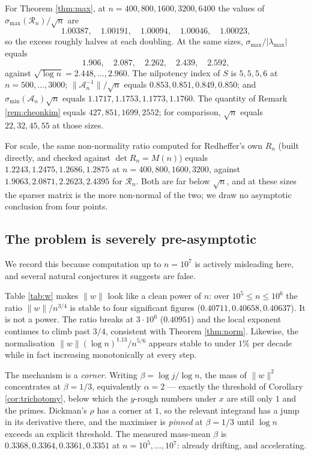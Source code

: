 \documentclass[11pt]{article}
\theoremstyle{definition}
\theoremstyle{remark}
\newcommand{\Rc}{\mathcal{R}}
\newcommand{\Ac}{\mathcal{A}}
\begin{document}
For Theorem \ref{thm:max}, at $n=400,800,1600,3200,6400$ the values of
$\sigma_{\max}(\Rc_n)/\sqrt n$ are
\[
 1.00387,\quad 1.00191,\quad 1.00094,\quad 1.00046,\quad 1.00023,
\]
so the excess roughly halves at each doubling. At the same sizes,
$\sigma_{\max}/|\lambda_{\max}|$ equals
\[
 1.906,\quad 2.087,\quad 2.262,\quad 2.439,\quad 2.592,
\]
against $\sqrt{\log n}=2.448,\dots,2.960$. The nilpotency index of $S$ is
$5,5,5,6$ at $n=500,\dots,3000$; $\|\Ac_n^{-1}\|/\sqrt n$ equals
$0.853,0.851,0.849,0.850$; and $\sigma_{\min}(\Ac_n)\sqrt n$ equals
$1.1717,1.1753,1.1773,1.1760$. The quantity of Remark \ref{rem:cheonkim} equals
$427,851,1699,2552$; for comparison, $\sqrt n$ equals $22,32,45,55$ at those
sizes.

For scale, the same non-normality ratio computed for Redheffer's own $R_n$ (built
directly, and checked against $\det R_n=M(n)$) equals
$1.2243,1.2475,1.2686,1.2875$ at $n=400,800,1600,3200$, against
$1.9063,2.0871,2.2623,2.4395$ for $\Rc_n$. Both are far below $\sqrt n$, and at
these sizes the sparser matrix is the more non-normal of the two; we draw no
asymptotic conclusion from four points.

\subsection{The problem is severely pre-asymptotic}\label{sec:preasymptotic}

We record this because computation up to $n=10^7$ is actively misleading here, and
several natural conjectures it suggests are false.

Table \ref{tab:w} makes $\|w\|$ look like a clean power of $n$: over
$10^5\le n\le10^6$ the ratio $\|w\|/n^{3/4}$ is stable to four significant figures
($0.40711,0.40658,0.40637$). It is not a power. The ratio breaks at $3\cdot10^6$
($0.40951$) and the local exponent continues to climb past $3/4$, consistent with
Theorem \ref{thm:norm}. Likewise, the normalisation $\|w\|(\log
n)^{1.13}/n^{5/6}$ appears stable to under $1\%$ per decade while in fact
increasing monotonically at every step.

The mechanism is a \emph{corner}. Writing $\beta=\log j/\log n$, the mass of
$\|w\|^2$ concentrates at $\beta=1/3$, equivalently $\alpha=2$ --- exactly the
threshold of Corollary \ref{cor:trichotomy}, below which the $y$-rough numbers
under $x$ are still only $1$ and the primes. Dickman's $\rho$ has a corner at $1$,
so the relevant integrand has a jump in its derivative there, and the maximiser is
\emph{pinned} at $\beta=1/3$ until $\log n$ exceeds an explicit threshold. The
measured mass-mean $\beta$ is $0.3368,0.3364,0.3361,0.3351$ at
$n=10^5,\dots,10^7$: already drifting, and accelerating.
\end{document}

